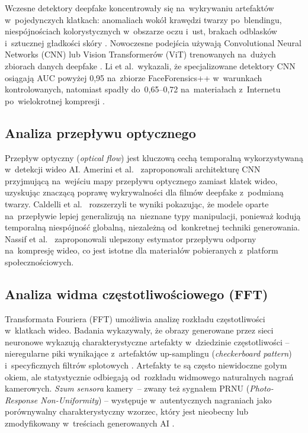 Wczesne detektory deepfake koncentrowa\l{}y si\k{e} na~wykrywaniu
artefakt\'{o}w w~pojedynczych klatkach: anomaliach wok\'{o}\l{}
kraw\k{e}dzi twarzy po~blendingu, niesp\'{o}jno\'{s}ciach kolorystycznych
w~obszarze oczu i~ust, brakach odblask\'{o}w i~sztucznej g\l{}adko\'{s}ci
skóry \cite{Matern2019ExploitingVisualArtifacts}.
Nowoczesne podej\'{s}cia u\.{z}ywaj\k{a} Convolutional Neural Networks (CNN)
lub Vision Transformer\'{o}w (ViT) trenowanych na~du\.{z}ych zbiorach
danych deepfake \cite{Dong2023CLIPDeepfake}.
Li et al.\ wykazali, \.{z}e specjalizowane detektory CNN osi\k{a}gaj\k{a} AUC
powy\.{z}ej 0,95 na~zbiorze FaceForensics++ w~warunkach kontrolowanych,
natomiast spad\l{}y do~0,65--0,72 na~materia\l{}ach z~Internetu
po~wielokrotnej kompresji \cite{Li2025AIGCSurvey}.

\subsection{Analiza przep\l{}ywu optycznego}

Przep\l{}yw optyczny (\textit{optical flow}) jest kluczow\k{a} cech\k{a}
temporaln\k{a} wykorzystywan\k{a} w~detekcji wideo AI.
Amerini et al.\ \cite{Amerini2019ICCV} zaproponowali
architektur\k{e} CNN przyjmuj\k{a}c\k{a} na~wej\'{s}ciu mapy przep\l{}ywu
optycznego zamiast klatek wideo, uzyskuj\k{a}c znacz\k{a}c\k{a} popraw\k{e}
wykrywalno\'{s}ci dla film\'{o}w deepfake z~podmian\k{a} twarzy.
Caldelli et al.\ \cite{Caldelli2021OpticalFlowCNN} rozszerzyli
te wyniki pokazuj\k{a}c, \.{z}e modele oparte na~przep\l{}ywie lepiej
generalizuj\k{a} na~nieznane typy manipulacji, poniewa\.{z} koduj\k{a}
temporaln\k{a} niesp\'{o}jno\'{s}\'{c} globaln\k{a}, niezale\.{z}n\k{a} od~konkretnej
techniki generowania.
Nassif et al.\ \cite{Nassif2022ImprovedOpticalFlow}
zaproponowali ulepszony estymator przep\l{}ywu odporny na~kompresj\k{e} wideo,
co jest istotne dla materia\l{}\'{o}w pobieranych z~platform spo\l{}eczno\'{s}ciowych.

\subsection{Analiza widma cz\k{e}stotliwo\'{s}ciowego (FFT)}

Transformata Fouriera (FFT) umo\.{z}liwia analiz\k{e} rozk\l{}adu
cz\k{e}stotliwo\'{s}ci w~klatkach wideo. Badania wykazywa\l{}y,
\.{z}e obrazy generowane przez sieci neuronowe wykazuj\k{a} charakterystyczne
artefakty w~dziedzinie cz\k{e}stotliwo\'{s}ci -- nieregularne piki
wynikaj\k{a}ce z~artefakt\'{o}w up-samplingu (\textit{checkerboard pattern})
i~specyficznych filtr\'{o}w splotowych \cite{Frank2020FrequencyDNN}.
Artefakty te s\k{a} cz\k{e}sto niewidoczne go\l{}ym okiem, ale statystycznie
odbiegaj\k{a} od~rozk\l{}adu widmowego naturalnych nagra\'{n} kamerowych.
\textit{Szum sensora} kamery~-- zwany te\.{z} sygna\l{}em PRNU (\textit{Photo-Response
Non-Uniformity}) -- wyst\k{e}puje w~autentycznych nagraniach jako por\'{o}wnywalny
charakterystyczny wzorzec, kt\'{o}ry jest nieobecny lub zmodyfikowany w~tre\'{s}ciach
generowanych AI \cite{Wang2024ReliabilityPerspective}.

